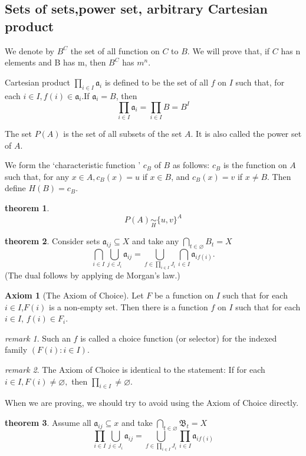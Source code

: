 \documentclass[a4paper,11pt]{article}%
\theoremstyle{remark}
\newtheorem*{remark}{remark}
\theoremstyle{definition}
\newtheorem{theorem}{theorem}[section]
\theoremstyle{definition}
\theoremstyle{plain}
\theoremstyle{definition}
\newtheorem{axiom}{Axiom}
\begin{document}
\subsection{Sets of sets,power set, arbitrary Cartesian product}
We denote by $B^C$ the set of all function on $C$ to $B$. We will prove that,
if $C$ has n elements and B has m, then $B^C$ has $m^n$.

Cartesian product $\prod_{i\in I}\mathfrak{a}_i$ is defined to be the set of
all $f$ on $I$ such that, for each $i\in I,f(i)\in \mathfrak{a}_i$.If $\mathfrak{a}_i=B$,
then
\[\prod_{i\in I}\mathfrak{a}_i=\prod_{i\in I}B=B^I\]

The set $P(A)$ is the set of all subsets of the set $A$. It is also called the 
power set of $A$.

We form the `characteristic function ' $c_B$ of $B$ as follows:
$c_B$ is the function on $A$ such that, for any $x\in A,c_B(x)=u$ if $x\in B$,
and $c_B(x)=v$ if $x\neq B$. Then define $H(B)=c_B$.
\begin{theorem}
    \[P(A)\underset{H}{\sim}\{u,v\}^A\]
\end{theorem}
\begin{theorem}
    Consider sets $\mathfrak{a}_{ij}\subseteq X$ and take any $\bigcap_{t\in\varnothing}B_t=X$
    \[\bigcap_{i\in I}\bigcup_{j\in  J_i}\mathfrak{a}_{ij}=\bigcup_{f\in\prod_{i\in I} J_i}\bigcap_{i\in I}\mathfrak{a}_{if(i)}.\]
    (The dual follows by applying de Morgan's law.)
\end{theorem}
\begin{axiom}[The Axiom of Choice]
    Let $F$ be a function on $I$ such that for each $i\in I$,$F(i)$ is
    a non-empty set. Then there is a function $f$ on $I$ such that for each
    $i\in I$, $f(i)\in F_i$.
\end{axiom}
\begin{remark}
    Such an $f$ is called a choice function (or selector) for the indexed family
    $(F(i):i\in I).$
\end{remark}
\begin{remark}
    The Axiom of Choice is identical to the statement: If for each $i\in I,F(i)\neq\varnothing,$
    then $\prod_{i\in I}\neq\varnothing$.
\end{remark}
When we are proving, we should try to avoid using the Axiom of Choice directly.
\begin{theorem}
    Assume all $\mathfrak{a}_{ij}\subseteq x$ and take $\bigcap_{t\in \varnothing}\mathfrak{B}_t=X$
    \[\prod_{i\in I}\bigcup_{j\in J_i}\mathfrak{a}_{ij}=\bigcup_{f\in \prod_{i\in I} J_i}\prod_{i\in I}\mathfrak{a}_{if(i)}\]
\end{theorem}
\end{document}
